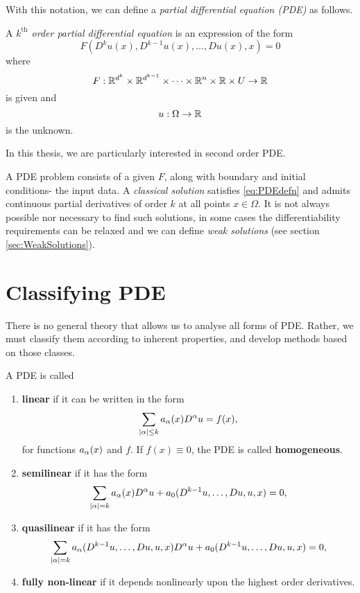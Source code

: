 With this notation, we can define a \textit{partial differential equation (PDE)}  as follows.

\begin{defn}
A \textit{$k^{\mbox{th}}$ order partial differential equation} is an expression of the form
\begin{equation}
F(D^k u(x), D^{k-1} u(x), \ldots, Du(x), x) =0 
\label{eq:PDEdefn}
\end{equation}
where
\[ F:\mathbb{R}^{d^k} \times \mathbb{R}^{d^{k-1}}\times \cdots \times \mathbb{R}^n \times \mathbb{R} \times U \rightarrow \mathbb{R} \]
is given and 
\[ u :\Omega \rightarrow \mathbb{R} \]
is the unknown.
\end{defn}

In this thesis, we are particularly interested in second order PDE.

A PDE problem consists of a given $F$, along with boundary and initial conditions- the input data. A \textit{classical solution} satisfies \ref{eq:PDEdefn} and admits continuous partial derivatives of order $k$ at all points $x\in\Omega$. It is not always possible nor necessary to find such solutions, in some cases the differentiability requirements can be relaxed and we can define \textit{weak solutions} (see section \ref{sec:WeakSolutions}). 

\section{Classifying PDE}
There is no general theory that allows us to analyse all forms of PDE. Rather, we must classify them according to inherent properties, and develop methods based on those classes.

\begin{defn}
A PDE is called
\begin{enumerate}
\item  \textbf{linear} if it can be written in the form 
\begin{equation}
\sum_{|{\alpha}|\leq k} a_{{\alpha}}(x) D^{{\alpha}}u=f(x),
\label{eq:defLinearPDE}
\end{equation}
for functions $a_{{\alpha}}(x)$ and $f$. If $f(x)\equiv 0$, the PDE is called \textbf{homogeneous}.
 
\item \textbf{semilinear} if it has the form
\begin{equation}
\sum_{|{\alpha}|= k} a_{{\alpha}}(x) D^{{\alpha}}u + a_0(D^{k-1}u, \ldots, Du,u,x)=0,
\label{eq:defSemilinearPDE}
\end{equation}

\item \textbf{quasilinear} if it has the form
\begin{equation}
\sum_{|{\alpha}|= k} a_{{\alpha}}(D^{k-1}u, \ldots, Du,u,x) D^{{\alpha}}u + a_0(D^{k-1}u, \ldots, Du,u,x)=0,
\label{eq:defQuasilinearPDE}
\end{equation}

\item \textbf{fully non-linear} if it depends nonlinearly upon the highest order derivatives.
\end{enumerate}
\end{defn}

